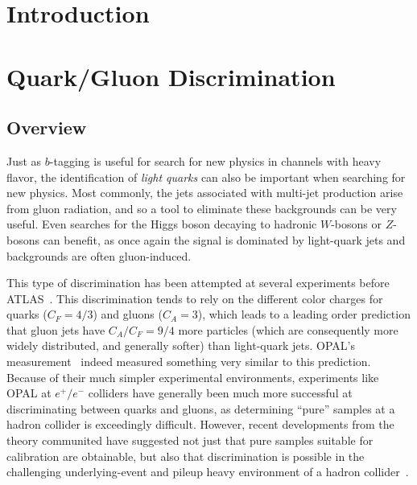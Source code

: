 \label{chapter:color}
\section{Introduction}


\section{Quark/Gluon Discrimination}
\label{jet-reconstruction:qg}
\subsection{Overview}
\label{jet-reconstruction:qg:overview}

Just as $b$-tagging is useful for search for new physics in channels with heavy flavor, the identification of \textit{light quarks} can also be important when searching for new physics. Most commonly, the jets associated with multi-jet production arise from gluon radiation, and so a tool to eliminate these backgrounds can be very useful. Even searches for the Higgs boson decaying to hadronic $W$-bosons or $Z$-bosons can benefit, as once again the signal is dominated by light-quark jets and backgrounds are often gluon-induced.

This type of discrimination has been attempted at several experiments before ATLAS~\cite{TevatronShapes1,QGNN,Pumplin,QGopal,Ariel,QGsub,QGlep,QGcleo,DelphiQG,DelphiQG2,AlephQG,L3QG}. This discrimination tends to rely on the different color charges for quarks ($C_F=4/3$) and gluons ($C_A=3$), which leads to a leading order prediction that gluon jets have $C_A/C_F = 9/4$ more particles (which are consequently more widely distributed, and generally softer) than light-quark jets. OPAL's measurement~\cite{QGopal} indeed measured something very similar to this prediction. Because of their much simpler experimental environments, experiments like OPAL at $e^+/e^-$ colliders have generally been much more successful at discriminating between quarks and gluons, as determining ``pure'' samples at a hadron collider is exceedingly difficult. However, recent developments from the theory communited have suggested not just that pure samples suitable for calibration are obtainable, but also that discrimination is possible in the challenging underlying-event and pileup heavy environment of a hadron collider~\cite{schwartz1,schwartz2}. 

